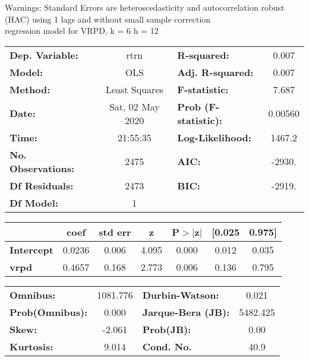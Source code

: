 Warnings: \newline
 [1] Standard Errors are heteroscedasticity and autocorrelation robust (HAC) using 1 lags and without small sample correction\\ 

regression model for VRPD, k = 6 h = 12\begin{center}
\begin{tabular}{lclc}
\toprule
\textbf{Dep. Variable:}    &       rtrn       & \textbf{  R-squared:         } &     0.007   \\
\textbf{Model:}            &       OLS        & \textbf{  Adj. R-squared:    } &     0.007   \\
\textbf{Method:}           &  Least Squares   & \textbf{  F-statistic:       } &     7.687   \\
\textbf{Date:}             & Sat, 02 May 2020 & \textbf{  Prob (F-statistic):} &  0.00560    \\
\textbf{Time:}             &     21:55:35     & \textbf{  Log-Likelihood:    } &    1467.2   \\
\textbf{No. Observations:} &        2475      & \textbf{  AIC:               } &    -2930.   \\
\textbf{Df Residuals:}     &        2473      & \textbf{  BIC:               } &    -2919.   \\
\textbf{Df Model:}         &           1      & \textbf{                     } &             \\
\bottomrule
\end{tabular}
\begin{tabular}{lcccccc}
                   & \textbf{coef} & \textbf{std err} & \textbf{z} & \textbf{P$> |$z$|$} & \textbf{[0.025} & \textbf{0.975]}  \\
\midrule
\textbf{Intercept} &       0.0236  &        0.006     &     4.095  &         0.000        &        0.012    &        0.035     \\
\textbf{vrpd}      &       0.4657  &        0.168     &     2.773  &         0.006        &        0.136    &        0.795     \\
\bottomrule
\end{tabular}
\begin{tabular}{lclc}
\textbf{Omnibus:}       & 1081.776 & \textbf{  Durbin-Watson:     } &    0.021  \\
\textbf{Prob(Omnibus):} &   0.000  & \textbf{  Jarque-Bera (JB):  } & 5482.425  \\
\textbf{Skew:}          &  -2.061  & \textbf{  Prob(JB):          } &     0.00  \\
\textbf{Kurtosis:}      &   9.014  & \textbf{  Cond. No.          } &     40.9  \\
\bottomrule
\end{tabular}
\end{center}

